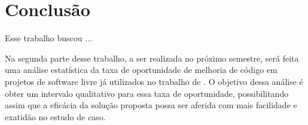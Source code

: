 \chapter{Conclusão}

Esse trabalho buscou ...

Na segunda parte desse trabalho, a ser realizada no próximo semestre, será feita uma análise estatística da taxa de oportunidade de melhoria de código em projetos de software livre já utilizados no trabalho de \cite{Meirelles2013}. O objetivo dessa análise é obter um intervalo qualitativo para essa taxa de oportunidade, possibilitando assim que a eficácia da solução proposta possa ser aferida com mais facilidade e exatidão no estudo de caso.